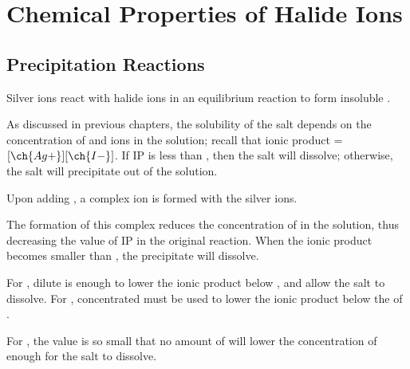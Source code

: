 

	\section{Chemical Properties of Halide Ions}

		\subsection{Precipitation Reactions}

			Silver ions react with halide ions in an equilibrium reaction to form insoluble .


			As discussed in previous chapters, the solubility of the  salt depends on the concentration of  and  ions
			in the solution; recall that ionic product = $[\ch{Ag+}][\ch{I-}]$. If IP is less than \Ksp{}, then the salt will dissolve; otherwise,
			the salt will precipitate out of the solution.

			Upon adding , a complex ion is formed with the silver ions.


			The formation of this complex reduces the concentration of  in the solution, thus decreasing the value of IP in the original
			reaction. When the ionic product becomes smaller than \Ksp{}, the precipitate will dissolve.

			For , dilute  is enough to lower the ionic product below \Ksp{}, and allow the salt to dissolve. For
			, concentrated  must be used to lower the ionic product below the \Ksp{} of .

			For , the \Ksp{} value is so small that no amount of  will lower the concentration of  enough for
			the salt to dissolve.


